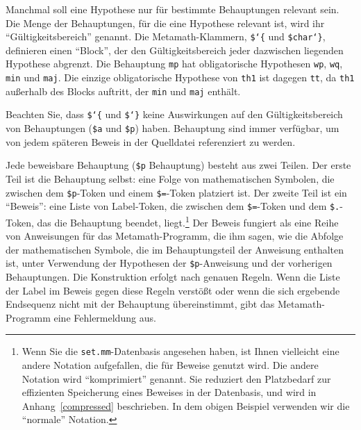 Manchmal soll eine Hypothese nur für bestimmte Behauptungen relevant sein.
Die Menge der Behauptungen, für die eine Hypothese relevant ist, wird ihr "`Gültigkeitsbereich"' genannt.  Die Metamath-Klammern, \texttt{\$\char`\{} und \texttt{\$char`\}}, definieren einen "`Block"', der den Gültigkeitsbereich jeder dazwischen liegenden Hypothese abgrenzt.  Die Behauptung \texttt{mp} hat obligatorische Hypothesen \texttt{wp}, \texttt{wq}, \texttt{min} und \texttt{maj}.  Die einzige obligatorische Hypothese von \texttt{th1} ist dagegen \texttt{tt}, da \texttt{th1} außerhalb des Blocks auftritt, der \texttt{min} und \texttt{maj} enthält.

Beachten Sie, dass \texttt{\$\char`\{} und \texttt{\$\char`\}} keine Auswirkungen auf den Gültigkeitsbereich von Behauptungen (\texttt{\$a} und \texttt{\$p}) haben.  Behauptung sind immer verfügbar, um von jedem späteren Beweis in der Quelldatei referenziert zu werden.

Jede beweisbare Behauptung (\texttt{\$p} Behauptung) besteht aus zwei Teilen.  Der erste Teil ist die Behauptung selbst: eine Folge von mathematischen Symbolen, die zwischen dem \texttt{\$p}-Token und einem \texttt{\$=}-Token platziert ist.  Der zweite Teil ist ein "`Beweis"': eine Liste von Label-Token, die zwischen dem \texttt{\$=}-Token und dem \texttt{\$.}-Token, das die Behauptung beendet, liegt.\footnote{Wenn Sie die \texttt{set.mm}-Datenbasis angesehen haben, ist Ihnen vielleicht eine andere Notation aufgefallen, die für
Beweise genutzt wird.  Die andere Notation wird "`komprimiert"' genannt. Sie reduziert den Platzbedarf zur effizienten Speicherung eines Beweises in der Datenbasis, und wird in Anhang~\ref{compressed} beschrieben.  In dem obigen Beispiel verwenden wir die "`normale"' Notation.} 
Der Beweis fungiert als eine Reihe von Anweisungen für das Metamath-Programm, die ihm sagen, wie die Abfolge der mathematischen Symbole, die im Behauptungsteil der Anweisung enthalten ist, unter Verwendung der Hypothesen der \texttt{\$p}-Anweisung und der vorherigen Behauptungen.  Die Konstruktion erfolgt nach genauen Regeln.  Wenn die Liste der Label im Beweis gegen diese Regeln verstößt oder wenn die sich ergebende Endsequenz nicht mit der Behauptung übereinstimmt, gibt das Metamath-Programm eine Fehlermeldung aus.

